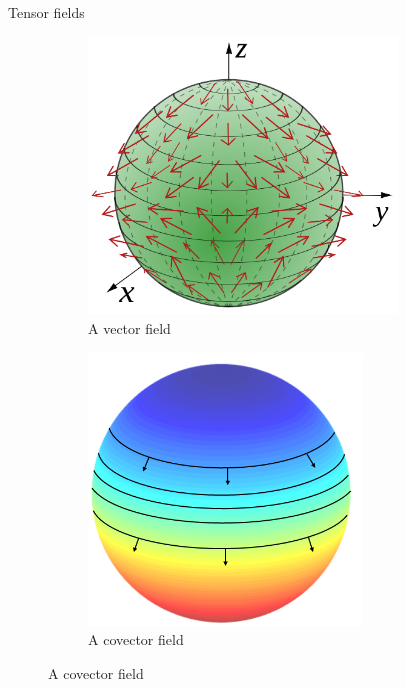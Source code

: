 \documentclass{beamer}
\begin{document}
\begin{frame}{Tensor fields}
\begin{figure}[h!]
\begin{subfigure}{.3333\textwidth}
            \includegraphics[width=0.9\textwidth]{images/vector_field_sphere.png}
            \caption{A vector field}
            \label{fig:sub2}
        \end{subfigure}%
        \begin{subfigure}{.3334\textwidth}
          \centering   
          \includegraphics[width=0.8\textwidth]{images/covector field.png}
          \caption{A covector field}
          \label{fig:sub2}
      \end{subfigure}   
    \end{figure}
\end{frame}
\end{document}
